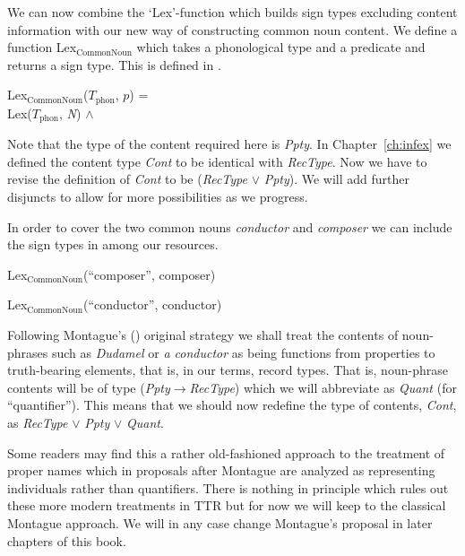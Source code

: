 We can now combine the `Lex'-function which builds sign types
excluding content information with our new way of constructing common
noun content.  We define a function Lex$_{\mathrm{CommonNoun}}$ which
takes a phonological type and a predicate and returns a sign type.
This is defined in \nexteg{}.
\begin{ex} 
Lex$_{\mathrm{CommonNoun}}$($T_{\mathrm{phon}}$, $p$) = \\
\hspace*{1em}Lex($T_{\mathrm{phon}}$, \textit{N}) \d{$\wedge$}  
\end{ex} 
Note that the type of the content required here is \textit{Ppty}.  In
Chapter~\ref{ch:infex} we defined the content type \textit{Cont} to be
identical with \textit{RecType}.  Now we have to revise the definition
of \textit{Cont} to be (\textit{RecType} $\vee$ \textit{Ppty}).  We
will add further disjuncts to allow for more possibilities as we
progress.

In order to cover the two common nouns \textit{conductor} and
\textit{composer} we can include the sign types in \nexteg{} among our
resources.
\begin{ex} 
\begin{subex} 
 
\item Lex$_{\mathrm{CommonNoun}}$(``composer'', composer) 
 
\item Lex$_{\mathrm{CommonNoun}}$(``conductor'', conductor) 
 
\end{subex} 
   
\end{ex} 

Following Montague's (\citeyear{Montague1973}) original strategy we
shall treat the contents of noun-phrases such as \textit{Dudamel} or
\textit{a conductor} as being functions from properties to
truth-bearing elements, that is, in our terms, record types.  That is,
noun-phrase contents will be of type
(\textit{Ppty}$\rightarrow$\textit{RecType}) which we will abbreviate
as \textit{Quant} (for ``quantifier''). This means that we should now
redefine the type of contents, \textit{Cont}, as \textit{RecType}
$\vee$ \textit{Ppty} $\vee$ \textit{Quant}.

Some readers may find this a rather old-fashioned approach to the
treatment of proper names which in proposals after Montague are
analyzed as representing individuals rather than quantifiers.  There
is nothing in principle which rules out these more modern treatments
in TTR but for now we will keep to the classical Montague approach.
We will in any case change Montague's proposal in later chapters of
this book.
   

